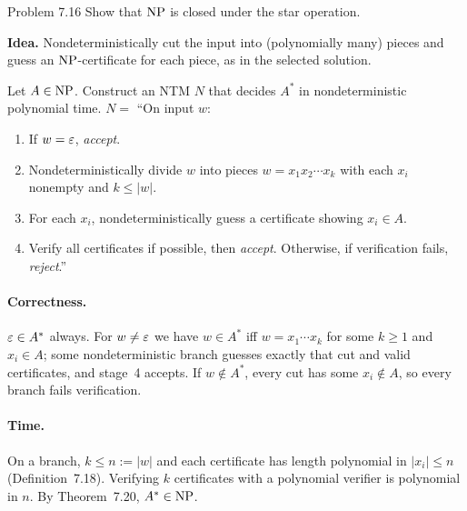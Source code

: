 \begin{question}{Problem 7.16}
Show that $\mathrm{NP}$ is closed under the star operation.
\end{question}
\begin{soln}
\textbf{Idea.} Nondeterministically cut the input into (polynomially many) pieces and guess an $\mathrm{NP}$-certificate for each piece, as in the selected solution.

Let $A\in\mathrm{NP}$. Construct an NTM $N$ that decides $A^*$ in nondeterministic polynomial time.
$N=$ ``On input $w$:
\begin{enumerate}
\item If $w=\varepsilon$, \emph{accept}.
\item Nondeterministically divide $w$ into pieces $w=x_1x_2\cdots x_k$ with each $x_i$ nonempty and $k\le|w|$.
\item For each $x_i$, nondeterministically guess a certificate showing $x_i\in A$.
\item Verify all certificates if possible, then \emph{accept}.
Otherwise, if verification fails, \emph{reject}.''
\end{enumerate}

\paragraph{Correctness.}
$\varepsilon\in A^*$ always. For $w\neq\varepsilon$ we have $w\in A^*$ iff $w=x_1\cdots x_k$ for some $k\ge 1$ and $x_i\in A$; some nondeterministic branch guesses exactly that cut and valid certificates, and stage~4 accepts. If $w\notin A^*$, every cut has some $x_i\notin A$, so every branch fails verification.

\paragraph{Time.}
On a branch, $k\le n:=|w|$ and each certificate has length polynomial in $|x_i|\le n$ (Definition~7.18). Verifying $k$ certificates with a polynomial verifier is polynomial in $n$. By Theorem~7.20, $A^*\in\mathrm{NP}$.
\end{soln}

